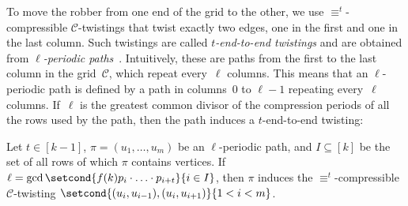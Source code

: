 \documentclass[a4paper,english, thm-restate]{lipics-v2021}
\newcommand{\defining}[1]{\emph{#1}}
\newcommand{\comp}{\equiv}
\newcommand{\grid}{\mathcal{C}}
\begin{document}
To move the robber from one end of the grid to the other,
we use $\comp^t$\nobreakdash-compressible $\grid$\nobreakdash-twistings that twist exactly two edges, one in the first and one in the last column.
Such twistings are called \defining{$t$-end-to-end twistings} and are obtained from
%
\defining{$\ell$-periodic paths}~\cite{DBLP:conf/focs/GroheLNS23}.
Intuitively, these are paths from the first to the last column in the grid~$\grid$, which repeat every~$\ell$ columns. This means that an $\ell$-periodic path is defined by a path in columns~$0$ to $\ell-1$ repeating every~$\ell$ columns.
If~$\ell$ is the greatest common divisor of the compression periods of all the rows used by the path, then the path induces a $t$-end-to-end twisting:

\begin{lemma}
        \label{lem:periodic-paths-to-twistings}
        Let $t \in [k-1]$, $\pi=(u_1,\dots,u_m)$ be an $\ell$-periodic path,
        and $I \subseteq[k]$ be the set of all rows
        of which $\pi$ contains vertices.
        If $\ell = \gcd \setcond{f(k)p_i\cdot \ldots \cdot p_{i+t}}{i \in I}$,
        then $\pi$ induces the $\comp^t$-compressible $\grid$-twisting
        $\setcond{(u_i, u_{i-1}), (u_i,u_{i+1})}{1<i<m}$.
        
\end{lemma}
\end{document}
